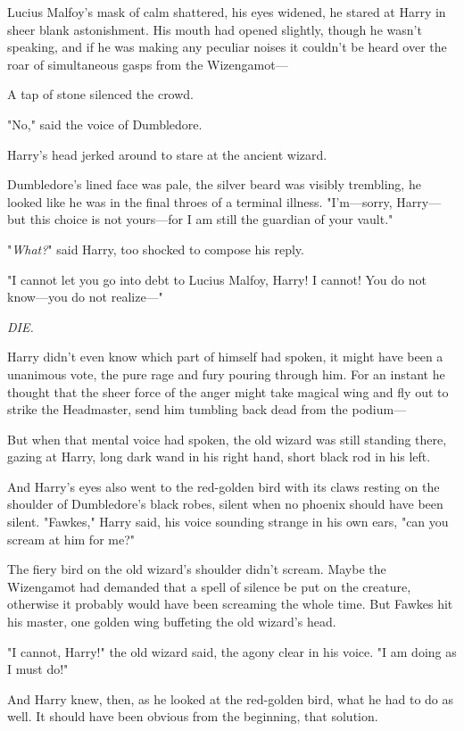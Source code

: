 Lucius Malfoy's mask of calm shattered, his eyes widened, he stared at Harry in 
sheer blank astonishment. His mouth had opened slightly, though he wasn't 
speaking, and if he was making any peculiar noises it couldn't be heard over 
the roar of simultaneous gasps from the Wizengamot---

A tap of stone silenced the crowd.

"No," said the voice of Dumbledore.

Harry's head jerked around to stare at the ancient wizard.

Dumbledore's lined face was pale, the silver beard was visibly trembling, he 
looked like he was in the final throes of a terminal illness. "I'm---sorry, 
Harry---but this choice is not yours---for I am still the guardian of your 
vault."

"\emph{What?}" said Harry, too shocked to compose his reply.

"I cannot let you go into debt to Lucius Malfoy, Harry! I cannot! You do not 
know---you do not realize---"

\emph{DIE.}

Harry didn't even know which part of himself had spoken, it might have been a 
unanimous vote, the pure rage and fury pouring through him. For an instant he 
thought that the sheer force of the anger might take magical wing and fly out 
to strike the Headmaster, send him tumbling back dead from the podium---

But when that mental voice had spoken, the old wizard was still standing there, 
gazing at Harry, long dark wand in his right hand, short black rod in his left.

And Harry's eyes also went to the red-golden bird with its claws resting on the 
shoulder of Dumbledore's black robes, silent when no phoenix should have been 
silent. "Fawkes," Harry said, his voice sounding strange in his own ears, "can 
you scream at him for me?"

The fiery bird on the old wizard's shoulder didn't scream. Maybe the Wizengamot 
had demanded that a spell of silence be put on the creature, otherwise it 
probably would have been screaming the whole time. But Fawkes hit his master, 
one golden wing buffeting the old wizard's head.

"I cannot, Harry!" the old wizard said, the agony clear in his voice. "I am 
doing as I must do!"

And Harry knew, then, as he looked at the red-golden bird, what he had to do as 
well. It should have been obvious from the beginning, that solution.

